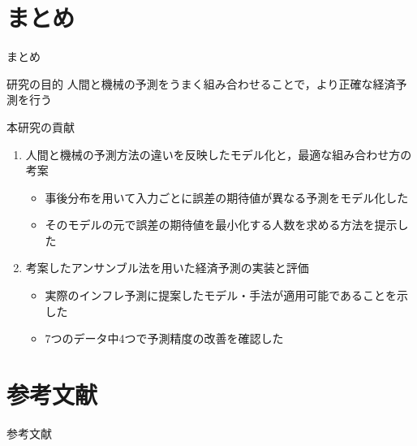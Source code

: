 \documentclass[dvipdfmx,aspectratio=169]{beamer}
\begin{document}
\section{まとめ}

\begin{frame}{まとめ}
\begin{block}{研究の目的}
  人間と機械の予測をうまく組み合わせることで，より正確な経済予測を行う
\end{block}
\begin{alertblock}{本研究の貢献}
  \begin{enumerate}
    \item 人間と機械の予測方法の違いを反映したモデル化と，最適な組み合わせ方の考案
    \begin{itemize}
      \item 事後分布を用いて入力ごとに誤差の期待値が異なる予測をモデル化した
      \item そのモデルの元で誤差の期待値を最小化する人数を求める方法を提示した
    \end{itemize}
    \medskip
    \item 考案したアンサンブル法を用いた経済予測の実装と評価
    \begin{itemize}
      \item 実際のインフレ予測に提案したモデル・手法が適用可能であることを示した
      \item 7つのデータ中4つで予測精度の改善を確認した
    \end{itemize}
  \end{enumerate}
\end{alertblock}
\end{frame}

\section*{参考文献}

\begin{frame}{参考文献}


\end{frame}

\appendix
\end{document}
